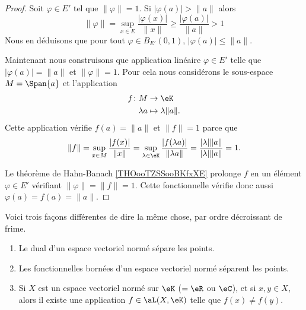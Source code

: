 \begin{proof}
    Soit \( \varphi\in E'\) tel que \( \| \varphi \|=1\). Si \( | \varphi(a) |>\| a \|\) alors
    \begin{equation}
        \| \varphi \|=\sup_{x\in E}\frac{ | \varphi(x) | }{ \| x \| }\geq \frac{ | \varphi(a) | }{ \| a \| }>1
    \end{equation}
    Nous en déduisons que pour tout \( \varphi\in B_{E'}(0,1)\), \( | \varphi(a) |\leq \|a  \|\).

    Maintenant nous construisons que application linéaire \( \varphi\in E'\) telle que \( | \varphi(a) |=\| a \|\) et \( \| \varphi \|=1\). Pour cela nous considérons le sous-espace \( M=\Span\{ a \}\) et l'application 
    \begin{equation}
        \begin{aligned}
            f\colon M&\to \eK \\
            \lambda a&\mapsto \lambda\| a \|. 
        \end{aligned}
    \end{equation}
    Cette application vérifie \( f(a)=\| a \|\) et \( \| f\|=1\) parce que
    \begin{equation}
        \| f \|=\sup_{x\in M}\frac{ | f(x) | }{ \| x \| }=\sup_{\lambda\in\eK}\frac{ | f(\lambda a) | }{ \| \lambda a \| }=\frac{ | \lambda |\| a \| }{ | \lambda |\| a \| }=1.
    \end{equation}
    
    Le théorème de Hahn-Banach \ref{THOooTZSSooBKfxXE} prolonge \( f\) en un élément \( \varphi\in E'\) vérifiant \( \| \varphi \|=\| f \|=1\). Cette fonctionnelle vérifie donc aussi \( \varphi(a)=f(a)=\| a \|\).
\end{proof}

\begin{corollary}        \label{CORooOBDHooJpiBrs}
    Voici trois façons différentes de dire la même chose, par ordre décroissant de frime.
    \begin{enumerate}
        \item
              Le dual d'un espace vectoriel normé sépare les points.
        \item
              Les fonctionnelles bornées d'un espace vectoriel normé séparent les points.
        \item
              Si \( X\) est un espace vectoriel normé sur \( \eK\) (\( =\eR\) ou \( \eC\)), et si \( x,y\in X\), alors il existe une application \( f\in\aL(X,\eK)\) telle que \( f(x)\neq f(y)\).
    \end{enumerate}
\end{corollary}

